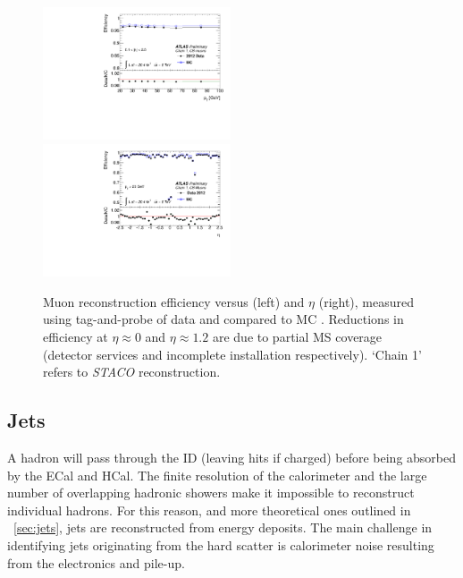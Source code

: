 \begin{description}
	\begin{figure}[t]
		\includegraphics[width=0.495\textwidth]{tex/selection/mu_recoeff_pt}
		\hfill
		\includegraphics[width=0.495\textwidth]{tex/selection/mu_recoeff_eta}
		\caption{Muon reconstruction efficiency versus \pt (left) and $\eta$ (right), 
		measured using tag-and-probe of \HepProcess{\PZ \HepTo \Pmu\Pmu} data and 
		compared to MC \cite{Muons:2012}. Reductions in efficiency at $\eta \approx 0$ 
		and $\eta \approx 1.2$ are due to partial MS coverage (detector services and 
		incomplete installation respectively). `Chain 1' refers to \textit{STACO} 
		reconstruction.}
		\label{fig:objects:mu_recoeff}
	\end{figure}

\end{description}



\subsection{Jets}
\label{sec:objects:jets}

A hadron will pass through the ID (leaving hits if charged) before being absorbed by 
the ECal and HCal. The finite resolution of the calorimeter and the 
large number of overlapping hadronic showers make it impossible to reconstruct individual 
hadrons. For this reason, and more theoretical ones outlined in \Section~\ref{sec:jets}, 
jets are reconstructed from energy deposits. The main challenge in identifying jets 
originating from the hard scatter is calorimeter noise resulting from the electronics and 
pile-up.

